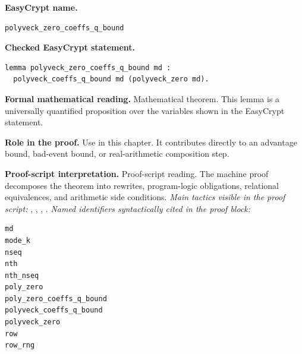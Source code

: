 \begin{formaltheorem}
\noindent\textbf{EasyCrypt name.}
\begin{lstlisting}[language=EasyCrypt,basicstyle=\ttfamily\scriptsize]
polyveck_zero_coeffs_q_bound
\end{lstlisting}
\noindent\textbf{Checked EasyCrypt statement.}
\begin{lstlisting}[language=EasyCrypt,basicstyle=\ttfamily\scriptsize]
lemma polyveck_zero_coeffs_q_bound md :
  polyveck_coeffs_q_bound md (polyveck_zero md).
\end{lstlisting}
\noindent\textbf{Formal mathematical reading.}
Mathematical theorem. This lemma is a universally quantified proposition over the variables shown in the EasyCrypt statement.

\noindent\textbf{Role in the proof.}
Use in this chapter. It contributes directly to an advantage bound, bad-event bound, or real-arithmetic composition step.

\noindent\textbf{Proof-script interpretation.}
Proof-script reading. The machine proof decomposes the theorem into rewrites, program-logic obligations, relational equivalences, and arithmetic side conditions.
\emph{Main tactics visible in the proof script:} , , , .
\emph{Named identifiers syntactically cited in the proof block:}
\begin{lstlisting}[language=EasyCrypt,basicstyle=\ttfamily\scriptsize]
md
mode_k
nseq
nth
nth_nseq
poly_zero
poly_zero_coeffs_q_bound
polyveck_coeffs_q_bound
polyveck_zero
row
row_rng
\end{lstlisting}

\end{formaltheorem}

